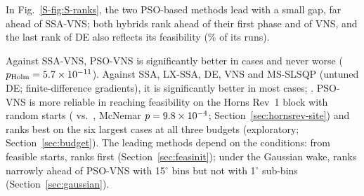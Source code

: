 In Fig.~\ref{S-fig:S-ranks}, the two PSO-based methods lead with a small gap, far ahead of SSA-VNS; both hybrids rank ahead of their first phase and of VNS, and the last rank of DE also reflects its feasibility (\NFeasDE\% of its runs).

Against SSA-VNS, PSO-VNS is significantly better in \NWtlSSAVNSW{} cases and never worse ($p_{\rm Holm}=5.7\times10^{-11}$). Against SSA, LX-SSA, DE, VNS and MS-SLSQP (untuned DE; finite-difference gradients), it is significantly better in most cases; \NLossesPhrase. PSO-VNS is more reliable in reaching feasibility on the Horns Rev~1 block with random starts (\NHRFeasPSOVNS{} vs.\ \NHRFeasPSO{}, McNemar $p=9.8\times10^{-4}$; Section~\ref{sec:hornsrev-site}) and ranks best on the six largest cases at all three budgets (exploratory; Section~\ref{sec:budget}). The leading methods depend on the conditions: from feasible starts, \NFbFeasBestRank{} ranks first (Section~\ref{sec:feasinit}); under the Gaussian wake, \NBestGauss{} ranks narrowly ahead of PSO-VNS with 15$^\circ$ bins but not with 1$^\circ$ sub-bins (Section~\ref{sec:gaussian}).

